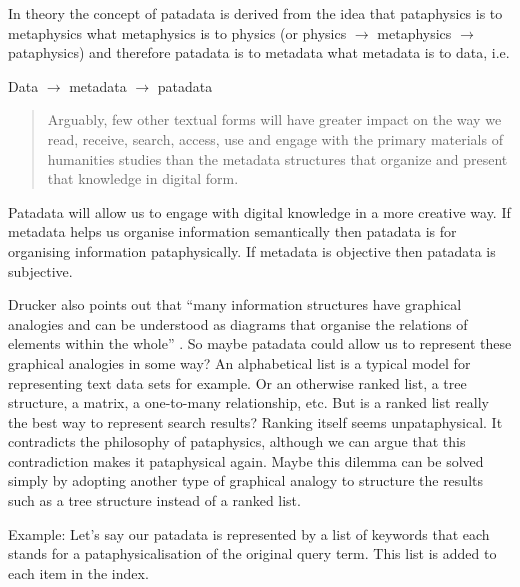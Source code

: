 %   

\spirals

In theory the concept of patadata is derived from the idea that pataphysics is to metaphysics what metaphysics is to physics (or physics $\to$ metaphysics $\to$ pataphysics) and therefore patadata is to metadata what metadata is to data, i.e.

Data $\to$ metadata $\to$ patadata

\begin{quotation}
  Arguably, few other textual forms will have greater impact on the way we read, receive, search, access, use and engage with the primary materials of humanities studies than the metadata structures that organize and present that knowledge in digital form. 
\end{quotation}

Patadata will allow us to engage with digital knowledge in a more creative way. If metadata helps us organise information semantically then patadata is for organising information pataphysically. If metadata is objective then patadata is subjective. 

Drucker also points out that ``many information structures have graphical analogies and can be understood as diagrams that organise the relations of elements within the whole'' \citeyear[p.16]{Drucker2009}. So maybe patadata could allow us to represent these graphical analogies in some way? An alphabetical list is a typical model for representing text data sets for example. Or an otherwise ranked list, a tree structure, a matrix, a one-to-many relationship, etc. But is a ranked list really the best way to represent search results? Ranking itself seems unpataphysical. It contradicts the philosophy of pataphysics, although we can argue that this contradiction makes it pataphysical again. Maybe this dilemma can be solved simply by adopting another type of graphical analogy to structure the results such as a tree structure instead of a ranked list.

Example: Let's say our patadata is represented by a list of keywords that each stands for a pataphysicalisation of the original query term. This list is added to each item in the index.

